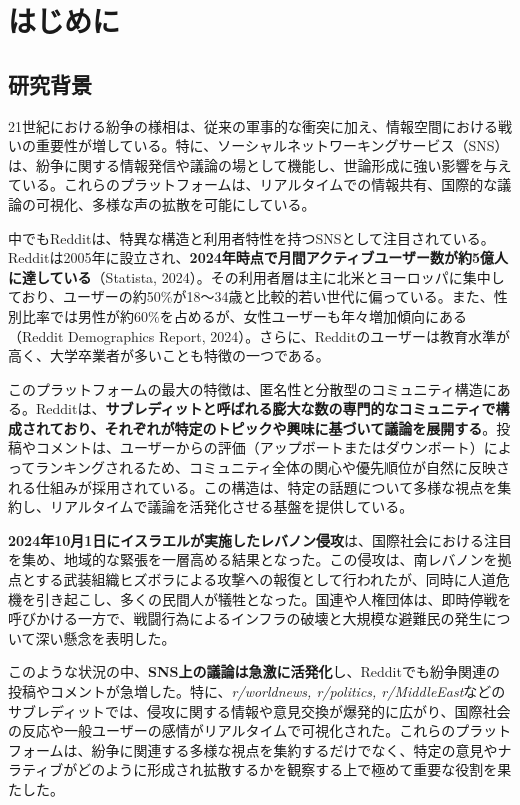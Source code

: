 \documentclass[11pt, a4j]{jreport}
\begin{document}
    \chapter{はじめに} %

    \section{研究背景}

    21世紀における紛争の様相は、従来の軍事的な衝突に加え、情報空間における戦いの重要性が増している。特に、ソーシャルネットワーキングサービス（SNS）は、紛争に関する情報発信や議論の場として機能し、世論形成に強い影響を与えている。これらのプラットフォームは、リアルタイムでの情報共有、国際的な議論の可視化、多様な声の拡散を可能にしている。

    中でもRedditは、特異な構造と利用者特性を持つSNSとして注目されている。Redditは2005年に設立され、\textbf{2024年時点で月間アクティブユーザー数が約5億人に達している}（Statista, 2024）。その利用者層は主に北米とヨーロッパに集中しており、ユーザーの約50\%が18～34歳と比較的若い世代に偏っている。また、性別比率では男性が約60\%を占めるが、女性ユーザーも年々増加傾向にある（Reddit Demographics Report, 2024）。さらに、Redditのユーザーは教育水準が高く、大学卒業者が多いことも特徴の一つである。

    このプラットフォームの最大の特徴は、匿名性と分散型のコミュニティ構造にある。Redditは、\textbf{サブレディットと呼ばれる膨大な数の専門的なコミュニティで構成されており、それぞれが特定のトピックや興味に基づいて議論を展開する}。投稿やコメントは、ユーザーからの評価（アップボートまたはダウンボート）によってランキングされるため、コミュニティ全体の関心や優先順位が自然に反映される仕組みが採用されている。この構造は、特定の話題について多様な視点を集約し、リアルタイムで議論を活発化させる基盤を提供している。

    \textbf{2024年10月1日にイスラエルが実施したレバノン侵攻}は、国際社会における注目を集め、地域的な緊張を一層高める結果となった。この侵攻は、南レバノンを拠点とする武装組織ヒズボラによる攻撃への報復として行われたが、同時に人道危機を引き起こし、多くの民間人が犠牲となった。国連や人権団体は、即時停戦を呼びかける一方で、戦闘行為によるインフラの破壊と大規模な避難民の発生について深い懸念を表明した。

    このような状況の中、\textbf{SNS上の議論は急激に活発化}し、Redditでも紛争関連の投稿やコメントが急増した。特に、\textit{r/worldnews, r/politics, r/MiddleEast}などのサブレディットでは、侵攻に関する情報や意見交換が爆発的に広がり、国際社会の反応や一般ユーザーの感情がリアルタイムで可視化された。これらのプラットフォームは、紛争に関連する多様な視点を集約するだけでなく、特定の意見やナラティブがどのように形成され拡散するかを観察する上で極めて重要な役割を果たした。
\end{document}
